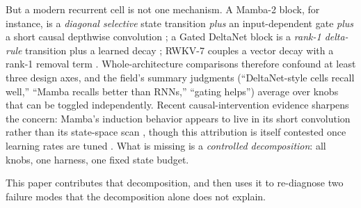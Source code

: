 \documentclass{article}
\begin{document}
But a modern recurrent cell is not one mechanism. A Mamba-2 block, for instance, is a \emph{diagonal selective} state transition \emph{plus} an input-dependent gate \emph{plus} a short causal depthwise convolution \citep{gu2023mamba,dao2024mamba2}; a Gated DeltaNet block is a \emph{rank-1 delta-rule} transition plus a learned decay \citep{yang2024deltanet,yang2024gateddeltanet}; RWKV-7 couples a vector decay with a rank-1 removal term \citep{peng2025rwkv7}. Whole-architecture comparisons therefore confound at least three design axes, and the field's summary judgments (``DeltaNet-style cells recall well,'' ``Mamba recalls better than RNNs,'' ``gating helps'') average over knobs that can be toggled independently. Recent causal-intervention evidence sharpens the concern: Mamba's induction behavior appears to live in its short convolution rather than its state-space scan \citep{arora2025convs,parnichkun2025ess}, though this attribution is itself contested once learning rates are tuned \citep{okpekpe2025recall}. What is missing is a \emph{controlled decomposition}: all knobs, one harness, one fixed state budget.

This paper contributes that decomposition, and then uses it to re-diagnose two failure modes that the decomposition alone does not explain.
\end{document}
